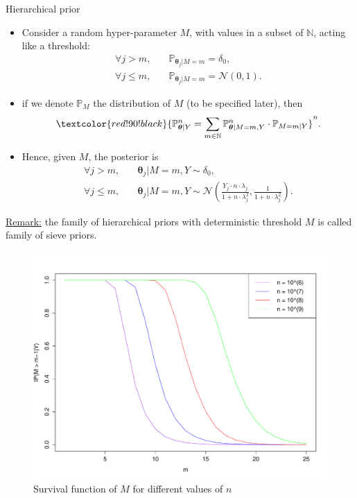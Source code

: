 \documentclass[final,hyperref={pdfpagelabels=false}]{beamer}
\begin{document}
\begin{frame}[t]
\begin{columns}[t]
\begin{column}{.30\textwidth}
\begin{block}{\rule{0pt}{2.5ex} Hierarchical prior}
\begin{itemize}
\item Consider a \textcolor{red!90!black}{random hyper-parameter $M$}, with values in a subset of $\mathbb{N}$, acting like a threshold:
\begin{align*}
\forall j > m ,& \quad \mathbb{P}_{\boldsymbol{\theta}_{j}\vert M = m} = \delta_{0},\\
\forall j \leq m ,& \quad \mathbb{P}_{\boldsymbol{\theta}_{j}\vert M = m} = \mathcal{N}\left(0, 1\right).
\end{align*}
\item if we denote $\mathbb{P}_{M}$ the distribution of $M$ (to be specified later), then
\[\textcolor{red!90!black}{\mathbb{P}_{\boldsymbol{\theta}\vert Y}^{n} = \sum\limits_{m \in \mathbb{N}} \mathbb{P}_{\boldsymbol{\theta} \vert M = m, Y}^{n} \cdot \mathbb{P}_{M = m \vert Y}}^{n}.\]
\end{itemize}
\begin{itemize}
\item Hence, given $M$, the posterior is
\begin{align*}
\forall j > m, &\quad \boldsymbol{\theta}_{j} \vert M = m, Y \sim \delta_{0},\\
\forall j \leq m, &\quad \boldsymbol{\theta}_{j} \vert M = m, Y \sim \mathcal{N}\left(\frac{Y_{j} \cdot n \cdot \lambda_{j}}{1 + n \cdot \lambda_{j}^{2}}, \frac{1}{1 + n \cdot \lambda_{j}^{2}} \right).
\end{align*}
\end{itemize}
\underline{Remark:} the family of hierarchical priors with deterministic threshold $M$ is called family of sieve priors.

\begin{figure}
\centering
 \includegraphics[width=0.4\linewidth]{M.pdf}
\caption{Survival function of $M$ for different values of $n$}\label{M}
\end{figure}


\end{block}
\end{column}
\end{columns}
\end{frame}
\end{document}
